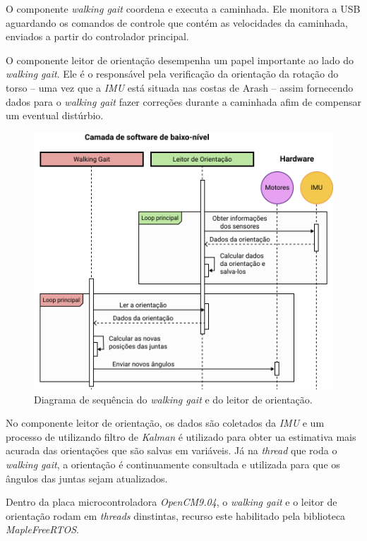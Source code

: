 O componente \textit{walking gait} coordena e executa a caminhada. Ele monitora a USB aguardando os comandos de controle que contém as velocidades da caminhada, enviados a partir do controlador principal.

O componente leitor de orientação desempenha um papel importante ao lado do \textit{walking gait}. Ele é o responsável pela verificação da orientação da rotação do torso -- uma vez que a \textit{IMU} está situada nas costas de Arash -- assim fornecendo dados para o \textit{walking gait} fazer correções durante a caminhada afim de compensar um eventual distúrbio.

\begin{figure}[htb]
	\centering
	\includegraphics[scale=0.8]{imagens/svg/softwarearchitecture-lowlevel}
	\caption{Diagrama de sequência do \textit{walking gait} e do leitor de orientação.}
	\label{fig:softwarearchitecture:lowlevel}
\end{figure}

No componente leitor de orientação, os dados são coletados da \textit{IMU} e um processo de utilizando filtro de \textit{Kalman} é utilizado para obter ua estimativa mais acurada das orientações que são salvas em variáveis. Já na \textit{thread} que roda o \textit{walking gait}, a orientação é continuamente consultada e utilizada para que os ângulos das juntas sejam atualizados.

Dentro da placa microcontroladora \textit{OpenCM9.04}, o \textit{walking gait} e o leitor de orientação rodam em \textit{threads} dinstintas, recurso este habilitado pela biblioteca \textit{MapleFreeRTOS}.

